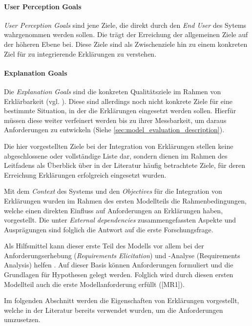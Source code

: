 \paragraph{User Perception Goals} \textit{User Perception Goals} sind jene Ziele, die direkt durch den \textit{End User} des Sytems wahrgenommen werden sollen. Die trägt der Erreichung der allgemeinen Ziele auf der höheren Ebene bei. Diese Ziele sind als Zwischenziele hin zu einem konkreten Ziel für zu integrierende Erklärungen zu verstehen.

\paragraph{Explanation Goals} Die \textit{Explanation Goals} sind die \glqq konkreten Qualitätsziele\grqq{} im Rahmen von Erklärbarkeit (vgl. \cite{schneider2012abenteuer}). Diese sind allerdings noch nicht konkrete Ziele für eine bestimmte Situation, in der die Erklärungen eingesetzt werden sollen. Hierfür müssen diese weiter verfeinert werden bis zu ihrer Messbarkeit, um daraus Anforderungen zu entwickeln (Siehe \autoref{sec:model_evaluation_description}).

\bigskip

Die hier vorgestellten Ziele bei der Integration von Erklärungen stellen keine abgeschlossene oder vollständige Liste dar, sondern dienen im Rahmen des Leitfadens als Überblick über in der Literatur häufig betrachtete Ziele, für deren Erreichung Erklärungen erfolgreich eingesetzt wurden.

\smallskip

\noindent{}

\smallskip

Mit dem \textit{Context} des Systems und den \textit{Objectives} für die Integration von Erklärungen wurden im Rahmen des ersten Modellteils die Rahmenbedingungen, welche einen direkten Einfluss auf Anforderungen an Erklärungen haben, vorgestellt. Die unter \textit{External dependencies} zusammengefassten Aspekte und Ausprägungen sind folglich die Antwort auf die erste Forschungsfrage.

Als Hilfsmittel kann dieser erste Teil des Modells vor allem bei der Anforderungserhebung (\textit{Requirements Elicitation}) und -Analyse (Requirements Analysis) helfen \cite{schneider2012abenteuer}. Auf dieser Basis können Anforderungen formuliert und die Grundlagen für Hypothesen gelegt werden. Folglich wird durch diesen ersten Modellteil auch die erste Modellanforderung erfüllt ([MR1]).

\smallskip

Im folgenden Abschnitt werden die Eigenschaften von Erklärungen vorgestellt, welche in der Literatur bereits verwendet wurden, um die Anforderungen umzusetzen.
